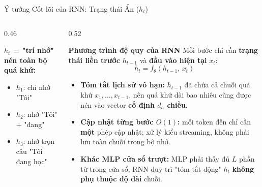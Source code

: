 \documentclass[aspectratio=169, 10pt]{beamer}
\begin{document}
\begin{frame}{Ý tưởng Cốt lõi của RNN: Trạng thái Ẩn (\(h_t\))}
\begin{columns}[T]
\begin{column}{0.46\textwidth}
\begin{center}
\end{center}
\vspace{-0.05cm}
{\footnotesize
\textbf{\(h_t\) = "trí nhớ" nén toàn bộ quá khứ:}
\begin{itemize}\itemsep1pt
    \item \(h_1\): chỉ nhớ "Tôi"
    \item \(h_2\): nhớ "Tôi" + "đang"
    \item \(h_3\): nhớ trọn câu "Tôi đang học"
\end{itemize}}
\end{column}
\begin{column}{0.52\textwidth}
\begin{exampleblock}{\textbf{Phương trình đệ quy của RNN}}
Mỗi bước chỉ cần \textbf{trạng thái liền trước} \(h_{t-1}\) và \textbf{đầu vào hiện tại} \(x_t\):
\[
    h_t = f_\theta\!\left(h_{t-1},\, x_t\right)
\]
\end{exampleblock}
\vspace{-0.05cm}
{\footnotesize
\begin{itemize}\itemsep2pt
    \item \textbf{Tóm tắt lịch sử vô hạn:} \(h_{t-1}\) đã chứa cả chuỗi quá khứ \(x_1, \ldots, x_{t-1}\), nên quá khứ dài bao nhiêu cũng được nén vào vector \textbf{cố định \(d_h\) chiều}.
    \item \textbf{Cập nhật từng bước \(O(1)\):} mỗi token đến chỉ cần \textbf{một} phép cập nhật; xử lý kiểu streaming, không phải lưu toàn chuỗi trong bộ nhớ.
    \item \textbf{Khác MLP cửa sổ trượt:} MLP phải thấy đủ \(L\) phần tử trong cửa sổ; RNN duy trì "tóm tắt động" \(h_t\) \textbf{không phụ thuộc độ dài} chuỗi.
\end{itemize}}
\end{column}
\end{columns}
\end{frame}
\end{document}
